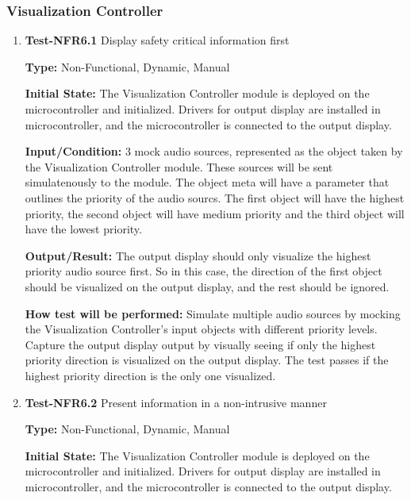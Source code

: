 \documentclass[12pt, titlepage]{article}
\begin{document}
\subsubsection{Visualization Controller}
		

\begin{enumerate}

\item{\textbf{Test-NFR6.1} Display safety critical information first\\}

\textbf{Type:} Non-Functional, Dynamic, Manual
					
\textbf{Initial State:} 
The Visualization Controller module is deployed on the microcontroller and 
initialized. Drivers for output display are installed in microcontroller, 
and the microcontroller is connected to the output display. 
					
\textbf{Input/Condition:} 
3 mock audio sources, represented as the object taken by the Visualization 
Controller module. These sources will be sent simulatenously to the module. The 
object meta will have a parameter that outlines the priority of the audio 
sourcs. The first object will have the highest priority, the second object will 
have medium priority and the third object will have the lowest priority.

\textbf{Output/Result:} 
The output display should only visualize the highest priority audio source 
first. So in this case, the direction of the first object should be visualized 
on the output display, and the rest should be ignored. 
					
\textbf{How test will be performed:} 
Simulate multiple audio sources by mocking the Visualization Controller's input 
objects with different priority levels. Capture the output display output by 
visually seeing if only the highest priority direction is visualized on the 
output display. The test passes if the highest priority direction is the only
 one visualized.

					
\item{\textbf{Test-NFR6.2} Present information in a non-intrusive manner\\}

\textbf{Type:} Non-Functional, Dynamic, Manual
					
\textbf{Initial State:} 
The Visualization Controller module is deployed on the microcontroller and 
initialized. Drivers for output display are installed in microcontroller, 
and the microcontroller is connected to the output display. 
					

\end{enumerate}
\end{document}
